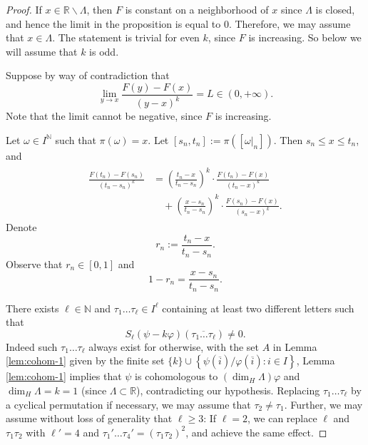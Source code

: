 \documentclass[10pt,a4paper]{amsart}
\newcommand\RR{\mathbb{R}}
\newcommand{\N}{\mathbb{N}}
\begin{document}
\begin{proof}%
{If $x\in\RR\backslash\Lambda$, then $F$ is constant on a neighborhood of $x$ since $\Lambda$ is closed, and hence the limit in the proposition is equal to $0$. Therefore, we may assume that $x\in\Lambda$.}
The statement is trivial for even $k$, since $F$ is increasing. So below we will assume that $k$ is odd.

Suppose by way of contradiction that 
\[
\lim_{y\rightarrow x}\frac{F(y)-F(x)}{(y-x)^{k}}=L\in(0,+\infty).
\]
Note that the limit cannot be negative, since $F$ is increasing.

Let $\omega \in I^\N$ such that $\pi(\omega)=x$.
Let $[s_n,t_n]:=\pi\left(\left[\omega|_{n}\right]\right)$. Then $s_n\leq x\leq t_n$, and
\begin{align}
\begin{split}
\frac{F(t_{n})-F(s_{n})}{(t_{n}-s_{n})^{k}} & =\left(\frac{t_{n}-x}{t_{n}-s_{n}}\right)^{k}\cdot\frac{F(t_{n})-F(x)}{(t_{n}-x)^{k}}\\
 & \quad+\left(\frac{x-s_{n}}{t_{n}-s_{n}}\right)^{k}\cdot\frac{F(s_{n})-F(x)}{(s_{n}-x)^{k}}.
\end{split}
\label{eq:secant-slope}
\end{align}
Denote 
$$r_{n}:=\frac{t_{n}-x}{t_{n}-s_{n}}.$$ 
Observe that $r_n\in[0,1]$ and
$$1-r_{n}=\frac{x-s_{n}}{t_{n}-s_{n}}.$$

There exists  $\ell\in\mathbb{N}$ and $\tau_{1}\dots \tau_{\ell}\in I^\ell$
containing at least two different letters such that 
\[
S_{\ell}(\psi-k\varphi)\left(\overline{\tau_{1}\dots \tau_{\ell}}\right)\neq0.
\]
Indeed such $\tau_{1}\dots \tau_{\ell}$ always exist for otherwise, with the set  $A$ in Lemma \ref{lem:cohom-1} given by the finite set $\{k\}\cup\left\{ \psi(\overline{i})/\varphi(\overline{i}):i\in I\right\}$, Lemma \ref{lem:cohom-1} implies that $\psi$ is cohomologous to $(\dim_{H}\Lambda)\varphi$
and $\dim_{H}\Lambda=k=1$ {(since $\Lambda\subset\RR$)}, contradicting our hypothesis. Replacing $\tau_1\dots\tau_\ell$ by a cyclical permutation if necessary, we may assume that $\tau_2\neq\tau_1$. {Further, we may assume without loss of generality that $\ell\geq 3$: If $\ell=2$, we can replace $\ell$ and $\tau_1\tau_2$ with $\ell'=4$ and $\tau_1'\dots\tau_4'=(\tau_1\tau_2)^2$, and achieve the same effect.}


\end{proof}
\end{document}
